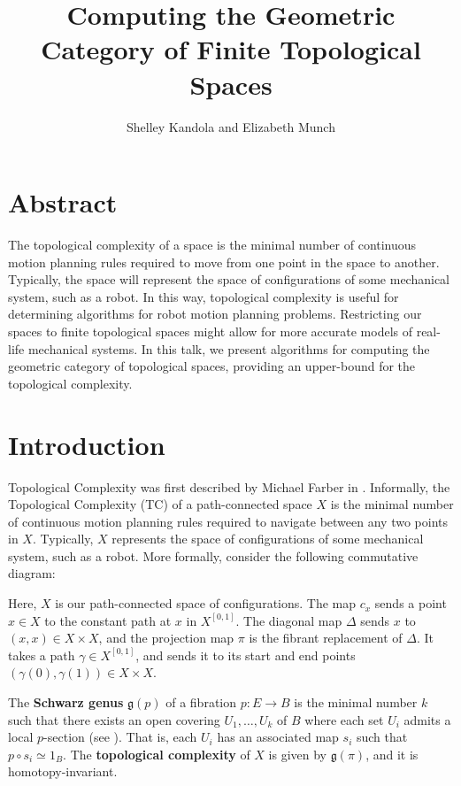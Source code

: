 \documentclass{article}
\title{Computing the Geometric Category of Finite Topological Spaces}
\author{Shelley Kandola and Elizabeth Munch}
\begin{document}
\maketitle

\section{Abstract}
The topological complexity of a space is the minimal number of continuous motion planning rules required to move from one point in the space to another.
Typically, the space will represent the space of configurations of some mechanical system, such as a robot.
In this way, topological complexity is useful for determining algorithms for robot motion planning problems.
Restricting our spaces to finite topological spaces might allow for more accurate models of real-life mechanical systems.
In this talk, we present algorithms for computing the geometric category of topological spaces, providing an upper-bound for the topological complexity.


\section{Introduction}

Topological Complexity was first described by Michael Farber in \cite{Farber2001}.
Informally, the Topological Complexity (TC) of a path-connected space $X$ is the minimal number of continuous motion planning rules required to navigate between any two points in $X$. Typically, $X$ represents the space of configurations of some mechanical system, such as a robot.
More formally, consider the following commutative diagram:

\begin{center}
\end{center}


Here, $X$ is our path-connected space of configurations.
The map $c_x$ sends a point $x\in X$ to the constant path at $x$ in $X^{[0,1]}$.
The diagonal map $\Delta$ sends $x$ to $(x,x)\in X \times X$, and the projection map $\pi$ is the fibrant replacement of $\Delta$.
It takes a path $\gamma \in X^{[0,1]}$, and sends it to its start and end points $(\gamma(0),\gamma(1)) \in X \times X$.

The {\bf Schwarz genus} $\mathfrak{g}(p)$ of a fibration $p:E \to B$ is the minimal number $k$ such that there exists an open covering $U_1,\hdots,U_k$ of $B$ where each set $U_i$ admits a local $p$-section (see \cite{Schwarz1958}).
That is, each $U_i$ has an associated map $s_i$ such that $p \circ s_i \simeq 1_B$. The \textbf{topological complexity} of $X$ is given by $\mathfrak{g}(\pi)$, and it is homotopy-invariant.
\end{document}
